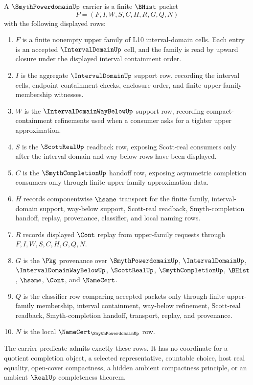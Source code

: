\begin{definition}
\label{def:smyth-powerdomain-carrier}
A $\SmythPowerdomainUp$ carrier is a finite $\BHist$ packet
$$
P=(F,I,W,S,C,H,R,G,Q,N)
$$
with the following displayed rows:
\begin{enumerate}
\item $F$ is a finite nonempty upper family of L10 interval-domain cells. Each entry is an accepted $\IntervalDomainUp$ cell, and the family is read by upward closure under the displayed interval containment order.
\item $I$ is the aggregate $\IntervalDomainUp$ support row, recording the interval cells, endpoint containment checks, enclosure order, and finite upper-family membership witnesses.
\item $W$ is the $\IntervalDomainWayBelowUp$ support row, recording compact-containment refinements used when a consumer asks for a tighter upper approximation.
\item $S$ is the $\ScottRealUp$ readback row, exposing Scott-real consumers only after the interval-domain and way-below rows have been displayed.
\item $C$ is the $\SmythCompletionUp$ handoff row, exposing asymmetric completion consumers only through finite upper-family approximation data.
\item $H$ records componentwise $\hsame$ transport for the finite family, interval-domain support, way-below support, Scott-real readback, Smyth-completion handoff, replay, provenance, classifier, and local naming rows.
\item $R$ records displayed $\Cont$ replay from upper-family requests through $F,I,W,S,C,H,G,Q,N$.
\item $G$ is the $\Pkg$ provenance over $\SmythPowerdomainUp$, $\IntervalDomainUp$, $\IntervalDomainWayBelowUp$, $\ScottRealUp$, $\SmythCompletionUp$, $\BHist$, $\hsame$, $\Cont$, and $\NameCert$.
\item $Q$ is the classifier row comparing accepted packets only through finite upper-family membership, interval containment, way-below refinement, Scott-real readback, Smyth-completion handoff, transport, replay, and provenance.
\item $N$ is the local $\NameCert_{\SmythPowerdomainUp}$ row.
\end{enumerate}
The carrier predicate admits exactly these rows. It has no coordinate for a quotient completion object, a selected representative, countable choice, host real equality, open-cover compactness, a hidden ambient compactness principle, or an ambient $\RealUp$ completeness theorem.
\end{definition}


